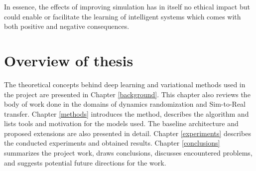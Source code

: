 
In essence, the effects of improving simulation has in itself no ethical impact but could enable or facilitate the learning of intelligent systems which comes with both positive and negative consequences.

\section{Overview of thesis}
The theoretical concepts behind deep learning and variational methods used in the project are presented in Chapter \ref{background}. This chapter also reviews the body of work done in the domains of dynamics randomization and Sim-to-Real transfer. Chapter \ref{methods} introduces the method, describes the \dettostoc{} algorithm and lists tools and motivation for the models used. The baseline architecture and proposed extensions are also presented in detail. Chapter \ref{experiments} describes the conducted experiments and obtained results. Chapter \ref{conclusions} summarizes the project work, draws conclusions, discusses encountered problems, and suggests potential future directions for the work.